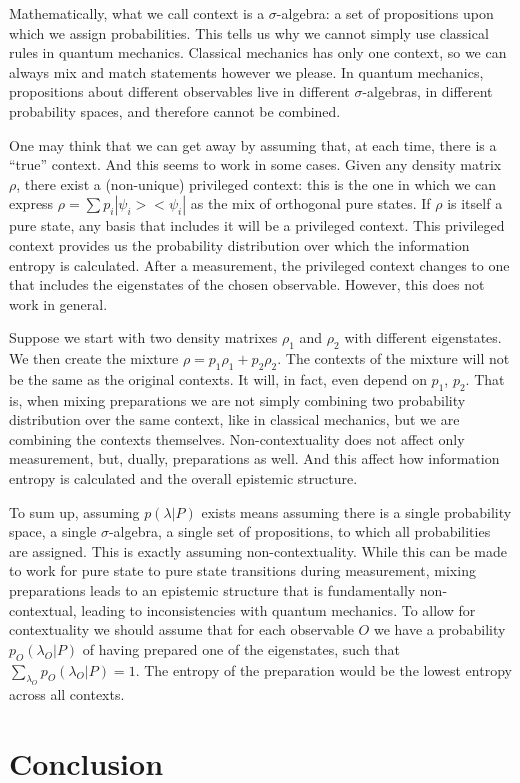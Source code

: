\documentclass[twocolumn,prl,floatfix,superscriptaddress]{revtex4-2}
\begin{document}
Mathematically, what we call context is a $\sigma$-algebra: a set of propositions upon which we assign probabilities. This tells us why we cannot simply use classical rules in quantum mechanics. Classical mechanics has only one context, so we can always mix and match statements however we please. In quantum mechanics, propositions about different observables live in different $\sigma$-algebras, in different probability spaces, and therefore cannot be combined.

One may think that we can get away by assuming that, at each time, there is a ``true'' context. And this seems to work in some cases. Given any density matrix $\rho$, there exist a (non-unique) privileged context: this is the one in which we can express $\rho = \sum p_i |\psi_i > < \psi_i|$ as the mix of orthogonal pure states. If $\rho$ is itself a pure state, any basis that includes it will be a privileged context. This privileged context provides us the probability distribution over which the information entropy is calculated. After a measurement, the privileged context changes to one that includes the eigenstates of the chosen observable. However, this does not work in general.

Suppose we start with two density matrixes $\rho_1$ and $\rho_2$ with different eigenstates. We then create the mixture $\rho = p_1 \rho_1 + p_2 \rho_2$. The contexts of the mixture will not be the same as the original contexts. It will, in fact, even depend on $p_1$, $p_2$. That is, when mixing preparations we are not simply combining two probability distribution over the same context, like in classical mechanics, but we are combining the contexts themselves. Non-contextuality does not affect only measurement, but, dually, preparations as well. And this affect how information entropy is calculated and the overall epistemic structure.


To sum up, assuming $p(\lambda|P)$ exists means assuming there is a single probability space, a single $\sigma$-algebra, a single set of propositions, to which all probabilities are assigned. This is exactly assuming non-contextuality. While this can be made to work for pure state to pure state transitions during measurement, mixing preparations leads to an epistemic structure that is fundamentally non-contextual, leading to inconsistencies with quantum mechanics. To allow for contextuality we should assume that for each observable $O$ we have a probability $p_O(\lambda_O|P)$ of having prepared one of the eigenstates, such that $\sum_{\lambda_O} p_O(\lambda_O|P) = 1$. The entropy of the preparation would be the lowest entropy across all contexts.



\section{Conclusion}

%




\end{document}
